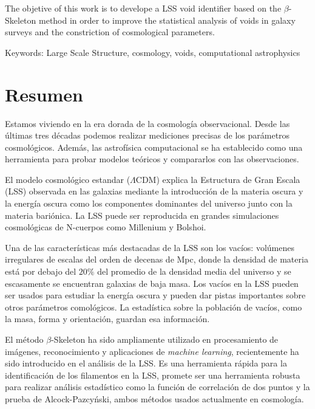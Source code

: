\documentclass[manuscript]{aastex62}
\begin{document}
  The objetive of this work is to develope a LSS void identifier based
  on the $\beta$-Skeleton method in order to improve the statistical
  analysis of voids in galaxy surveys and the constriction of
  cosmological parameters.

  \medskip

  Keywords: Large Scale Structure, cosmology, voids, computational astrophysics

  

  \section*{Resumen}

  Estamos viviendo en la era dorada de la cosmolog\'ia observacional.
  Desde las \'ultimas tres d\'ecadas podemos realizar mediciones precisas
  de los par\'ametros cosmol\'ogicos. Adem\'as,
  las astrof\'isica computacional se ha establecido como una herramienta para probar
  modelos te\'oricos y compararlos con las observaciones.

  El modelo cosmol\'ogico estandar ($\Lambda$CDM) explica la Estructura de Gran
  Escala (LSS) observada en las galaxias mediante la introducci\'on de la materia
  oscura y la energ\'ia oscura como los componentes dominantes del universo
  junto con la materia bari\'onica. La LSS puede ser reproducida en grandes
  simulaciones cosmol\'ogicas de N-cuerpos como Millenium y Bolshoi.

  Una de las caracter\'isticas m\'as destacadas de la LSS son los vac\'ios:
  vol\'umenes irregulares de escalas del orden de decenas de Mpc, donde la
  densidad de materia est\'a por debajo del $20\%$ del promedio de la densidad
  media del universo y se escasamente se encuentran galaxias de baja masa.
  Los vac\'ios en la LSS pueden ser usados para estudiar la energ\'ia oscura y pueden dar
  pistas importantes sobre otros par\'ametros comol\'ogicos.
  La estad\'istica sobre la poblaci\'on de vac\'ios, como la masa,
  forma y orientaci\'on, guardan esa informaci\'on.

  El m\'etodo $\beta$-Skeleton ha sido ampliamente utilizado en procesamiento
  de im\'agenes, reconocimiento y aplicaciones de \textit{machine learning},
  recientemente ha sido introducido en el an\'alisis de la LSS.
  Es una herramienta r\'apida para la identificaci\'on de los filamentos
  en la LSS, promete ser una herramienta robusta para realizar an\'alisis
  estad\'istico como la funci\'on de correlaci\'on de dos puntos y
  la prueba de Alcock-Pazcy\'nski, ambos  m\'etodos usados actualmente en
  cosmolog\'ia.
\end{document}
